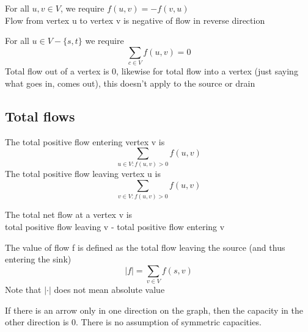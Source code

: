 \documentclass{article}[18pt]
\begin{document}
\begin{definition}
	For all $u,v\in V$, we require $f(u,v)=-f(v,u)$\\
	Flow from vertex u to vertex v is negative of flow in reverse direction
\end{definition}
\newpage
\begin{definition}
For all $u\in V - \{s,t\}$ we require
$$\sum_{c\in V}f(u,v)=0$$
Total flow out of a vertex is 0, likewise for total flow into a vertex (just saying what goes in, comes out), this doesn't apply to the source or drain
\end{definition}
\subsection{Total flows}
\begin{definition}
The total positive flow entering vertex v is
$$\sum_{u\in V: f(u,v)>0}f(u,v)$$
The total positive flow leaving vertex u is
$$\sum_{v\in V: f(u,v)>0}f(u,v)$$
\end{definition}

\begin{definition}
	The total net flow at a vertex v is\\
	total positive flow leaving v - total positive flow entering v
\end{definition}

\begin{definition}
	The value of flow f is defined as the total flow leaving the source (and thus entering the sink)
	$$|f|=\sum_{v\in V}f(s,v)$$
	Note that $|\cdot|$ does not mean absolute value
\end{definition}
If there is an arrow only in one direction on the graph, then the capacity in the other direction is 0. There is no assumption of symmetric capacities.
\end{document}
